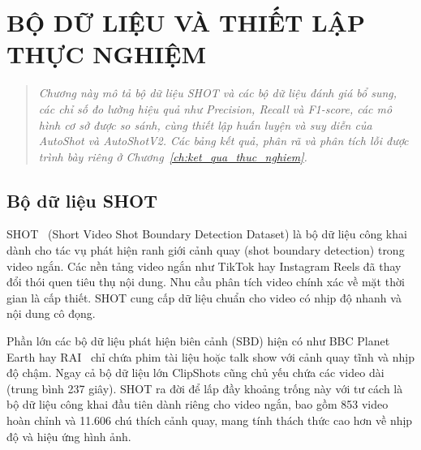 \chapter{BỘ DỮ LIỆU VÀ THIẾT LẬP THỰC NGHIỆM}
\label{chuong4}
\label{ch:bo_du_lieu_va_thuc_nghiem}

\vspace{-1.5cm} 

\begin{quotation}
    \noindent
    \small\textit{
   Chương này mô tả bộ dữ liệu SHOT và các bộ dữ liệu đánh giá bổ sung, các chỉ số đo lường hiệu quả như Precision, Recall và F1-score, các mô hình cơ sở được so sánh, cùng thiết lập huấn luyện và suy diễn của AutoShot và AutoShotV2. Các bảng kết quả, phân rã và phân tích lỗi được trình bày riêng ở Chương~\ref{ch:ket_qua_thuc_nghiem}.
    }
\end{quotation}
\vspace{1em} %


\section{Bộ dữ liệu SHOT}
SHOT~\cite{zhu2023autoshot} (Short Video Shot Boundary Detection Dataset) là bộ dữ liệu công khai dành cho tác vụ phát hiện ranh giới cảnh quay (shot boundary detection) trong video ngắn. Các nền tảng video ngắn như TikTok hay Instagram Reels đã thay đổi thói quen tiêu thụ nội dung. Nhu cầu phân tích video chính xác về mặt thời gian là cấp thiết. SHOT cung cấp dữ liệu chuẩn cho video có nhịp độ nhanh và nội dung cô đọng.

Phần lớn các bộ dữ liệu phát hiện biên cảnh (SBD) hiện có như BBC Planet Earth hay RAI~\cite{baraldi2015rai} chỉ chứa phim tài liệu hoặc talk show với cảnh quay tĩnh và nhịp độ chậm. Ngay cả bộ dữ liệu lớn ClipShots cũng chủ yếu chứa các video dài (trung bình 237 giây). SHOT ra đời để lấp đầy khoảng trống này với tư cách là bộ dữ liệu công khai đầu tiên dành riêng cho video ngắn, bao gồm 853 video hoàn chỉnh và 11.606 chú thích cảnh quay, mang tính thách thức cao hơn về nhịp độ và hiệu ứng hình ảnh.



